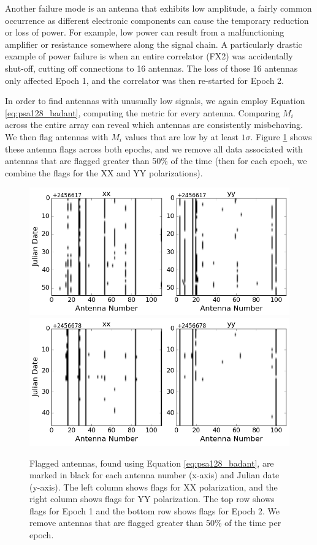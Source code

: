 Another failure mode is an antenna that exhibits low amplitude, a fairly common occurrence as different electronic components can cause the temporary reduction or loss of power. For example, low power can result from a malfunctioning amplifier or resistance somewhere along the signal chain. A particularly drastic example of power failure is when an entire correlator (FX2) was accidentally shut-off, cutting off connections to 16 antennas. The loss of those 16 antennas only affected Epoch 1, and the correlator was then re-started for Epoch 2. 

In order to find antennas with unusually low signals, we again employ Equation \eqref{eq:psa128_badant}, computing the metric for every antenna. Comparing $M_{i}$ across the entire array can reveal which antennas are consistently misbehaving. We then flag antennas with $M_{i}$ values that are low by at least $1\sigma$. Figure \ref{fig:psa128_badants} shows these antenna flags across both epochs, and we remove all data associated with antennas that are flagged greater than 50\% of the time (then for each epoch, we combine the flags for the XX and YY polarizations).

\begin{figure}
	\centering
	\includegraphics[trim={0cm 0cm 0cm 0cm},clip,height=0.35\textwidth]{plots/psa128_badants_S1E1.png}
	\includegraphics[trim={0cm 0cm 0cm 0cm},clip,height=0.35\textwidth]{plots/psa128_badants_S1E2.png}
	\caption{Flagged antennas, found using Equation \eqref{eq:psa128_badant}, are marked in black for each antenna number (x-axis) and Julian date (y-axis). The left column shows flags for XX polarization, and the right column shows flags for YY polarization. The top row shows flags for Epoch 1 and the bottom row shows flags for Epoch 2. We remove antennas that are flagged greater than 50\% of the time per epoch.}
	\label{fig:psa128_badants}
\end{figure}

